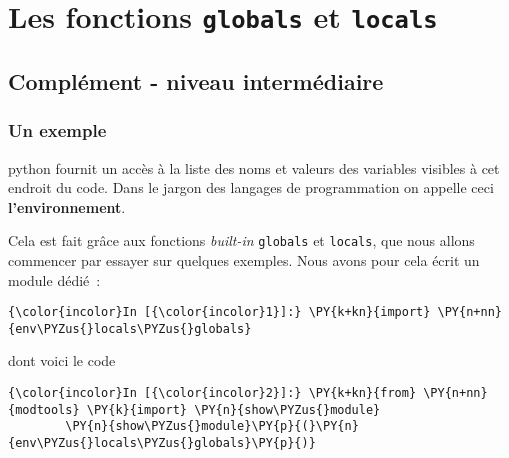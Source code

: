    
    
    
    

    

    \hypertarget{les-fonctions-globals-et-locals}{%
\section{\texorpdfstring{Les fonctions \texttt{globals} et
\texttt{locals}}{Les fonctions globals et locals}}\label{les-fonctions-globals-et-locals}}

    \hypertarget{compluxe9ment---niveau-intermuxe9diaire}{%
\subsection{Complément - niveau
intermédiaire}\label{compluxe9ment---niveau-intermuxe9diaire}}

    \hypertarget{un-exemple}{%
\subsubsection{Un exemple}\label{un-exemple}}

    python fournit un accès à la liste des noms et valeurs des variables
visibles à cet endroit du code. Dans le jargon des langages de
programmation on appelle ceci \textbf{l'environnement}.

Cela est fait grâce aux fonctions \emph{built-in} \texttt{globals} et
\texttt{locals}, que nous allons commencer par essayer sur quelques
exemples. Nous avons pour cela écrit un module dédié~:

    \begin{Verbatim}[commandchars=\\\{\}]
{\color{incolor}In [{\color{incolor}1}]:} \PY{k+kn}{import} \PY{n+nn}{env\PYZus{}locals\PYZus{}globals}
\end{Verbatim}


    dont voici le code

    \begin{Verbatim}[commandchars=\\\{\}]
{\color{incolor}In [{\color{incolor}2}]:} \PY{k+kn}{from} \PY{n+nn}{modtools} \PY{k}{import} \PY{n}{show\PYZus{}module}
        \PY{n}{show\PYZus{}module}\PY{p}{(}\PY{n}{env\PYZus{}locals\PYZus{}globals}\PY{p}{)}
\end{Verbatim}


